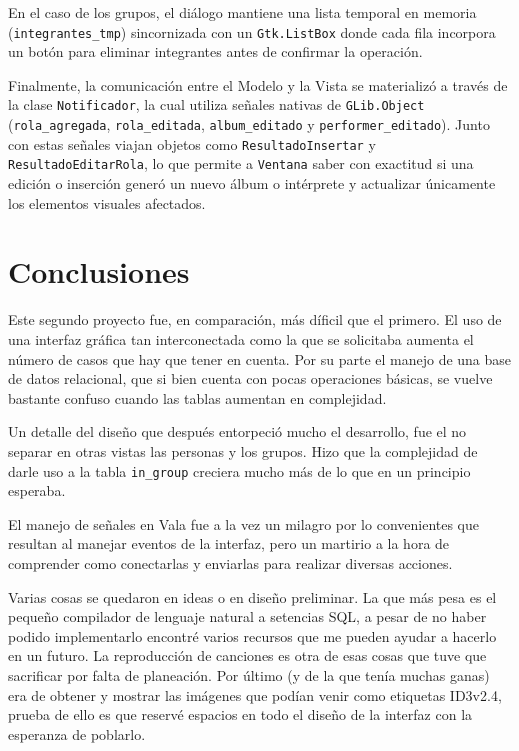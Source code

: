 \documentclass{rep}
\begin{document}
    En el caso de los grupos, el diálogo mantiene una lista temporal
    en memoria (\texttt{integrantes\_tmp}) sincornizada con un
    \texttt{Gtk.ListBox} donde cada fila incorpora un botón para
    eliminar integrantes antes de confirmar la operación. 

    Finalmente, la comunicación entre el Modelo y la Vista se
    materializó a través de la clase \texttt{Notificador}, la cual
    utiliza señales nativas de \texttt{GLib.Object}
    (\texttt{rola\_agregada}, \texttt{rola\_editada},
    \texttt{album\_editado} y \texttt{performer\_editado}). Junto con
    estas señales viajan objetos como \texttt{ResultadoInsertar} y
    \texttt{ResultadoEditarRola}, lo que permite a \texttt{Ventana}
    saber con exactitud si una edición o inserción generó un nuevo
    álbum o intérprete y actualizar únicamente los elementos visuales
    afectados.
    
    \section{Conclusiones}

    Este segundo proyecto fue, en comparación, más díficil que el
    primero. El uso de una interfaz gráfica tan interconectada como la
    que se solicitaba aumenta el número de casos que hay que tener en
    cuenta. Por su parte el manejo de una base de datos relacional,
    que si bien cuenta con pocas operaciones básicas, se vuelve
    bastante confuso cuando las tablas aumentan en complejidad.

    Un detalle del diseño que después entorpeció mucho el desarrollo,
    fue el no separar en otras vistas las personas y los grupos. Hizo
    que la complejidad de darle uso a la tabla \texttt{in\_group}
    creciera mucho más de lo que en un principio esperaba.

    El manejo de señales en Vala fue a la vez un milagro por
    lo convenientes que resultan al manejar eventos de la interfaz,
    pero un martirio a la hora de comprender como conectarlas y
    enviarlas para realizar diversas acciones.

    Varias cosas se quedaron en ideas o en diseño preliminar. La que
    más pesa es el pequeño compilador de lenguaje natural a setencias
    SQL, a pesar de no haber podido implementarlo encontré varios
    recursos que me pueden ayudar a hacerlo en un futuro. La
    reproducción de canciones es otra de esas cosas que tuve que
    sacrificar por falta de planeación. Por último (y de la que tenía
    muchas ganas) era de obtener y mostrar las imágenes que podían
    venir como etiquetas ID3v2.4, prueba de ello es que reservé
    espacios en todo el diseño de la interfaz con la esperanza de
    poblarlo.
\end{document}
